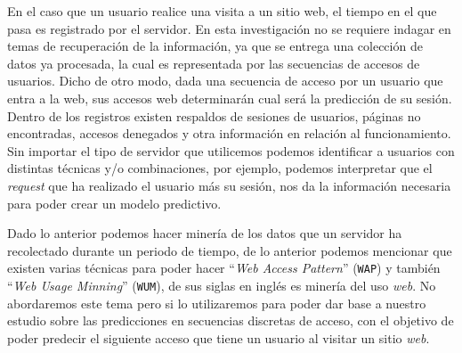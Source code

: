 
En el caso  que un usuario realice una visita a un sitio web, el tiempo en el que pasa es registrado por el servidor. En esta investigación no se requiere indagar en temas de recuperación de la información, ya que se entrega una colección de datos ya procesada, la cual es representada por las secuencias de accesos de usuarios. 
Dicho de otro modo, dada una secuencia de acceso por un usuario que entra a la web, sus accesos web determinarán cual será la predicción de su sesión. Dentro de los registros existen respaldos de sesiones de usuarios, páginas no encontradas, accesos denegados y otra información en relación al funcionamiento. Sin importar el tipo de servidor que utilicemos podemos identificar a usuarios con distintas técnicas y/o combinaciones, por ejemplo, podemos interpretar que el \emph{request} que ha realizado el usuario más su sesión, nos da la información necesaria para poder crear un modelo predictivo. 

Dado lo anterior podemos hacer minería de los datos que un servidor ha recolectado durante un periodo de tiempo, de lo anterior  podemos mencionar que existen varias técnicas para poder hacer ``\emph{Web Access Pattern}'' (\texttt{WAP}) y también ``\emph{Web Usage Minning}'' (\texttt{WUM}), de sus siglas en inglés es minería del uso \emph{web}. No abordaremos este tema pero si lo utilizaremos para poder dar base a nuestro estudio sobre las predicciones en secuencias discretas de acceso, con el objetivo de poder predecir el siguiente acceso que tiene un usuario al visitar un sitio \emph{web}.







